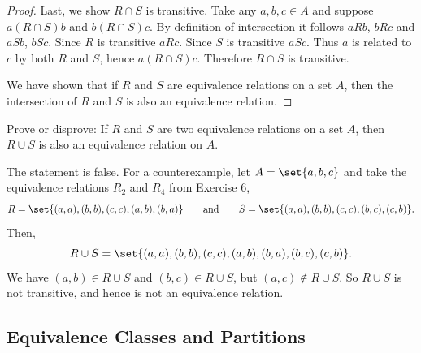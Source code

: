 \documentclass[DIN, pagenumber=false, fontsize=11pt, parskip=half]{scrartcl}
\begin{document}
\begin{problems}
\begin{proof}
        Last, we show $R \cap S$ is transitive. Take any $a,b,c \in A$ and suppose $a(R \cap S)b$ and $b(R \cap S)c$.
        By definition of intersection it follows $aRb$, $bRc$ and $aSb$, $bSc$.
        Since $R$ is transitive $aRc$.
        Since $S$ is transitive $aSc$.
        Thus $a$ is related to $c$ by both $R$ and $S$, hence $a(R \cap S)c$.
        Therefore $R \cap S$ is transitive.
        
        We have shown that if $R$ and $S$ are equivalence relations on a set $A$, then the intersection of $R$ and $S$ is also an equivalence relation.
    \end{proof}

    \problem Prove or disprove: If $R$ and $S$ are two equivalence relations on a set $A$, then $R \cup S$ is also an equivalence relation on $A$.
    
    \answer
    \begin{disproof}
        The statement is false.
        For a counterexample, let $A = \set{a,b,c}$ and take the equivalence relations $R_2$ and $R_4$ from Exercise 6,
        \[
            R = \set{(a,a),(b,b),(c,c),(a,b),(b,a)} \qquad \text{and} \qquad S = \set{(a,a),(b,b),(c,c),(b,c),(c,b)}.
        \]
        Then,
        \[
            R \cup S = \set{(a,a),(b,b),(c,c),(a,b),(b,a),(b,c),(c,b)}.
        \]
        We have $(a,b) \in R \cup S$ and $(b,c) \in R \cup S$, but $(a,c) \notin R \cup S$. So $R \cup S$ is not transitive, and hence is not an equivalence relation.
    \end{disproof}

    \end{problems}

\subsection{Equivalence Classes and Partitions}
\end{document}
